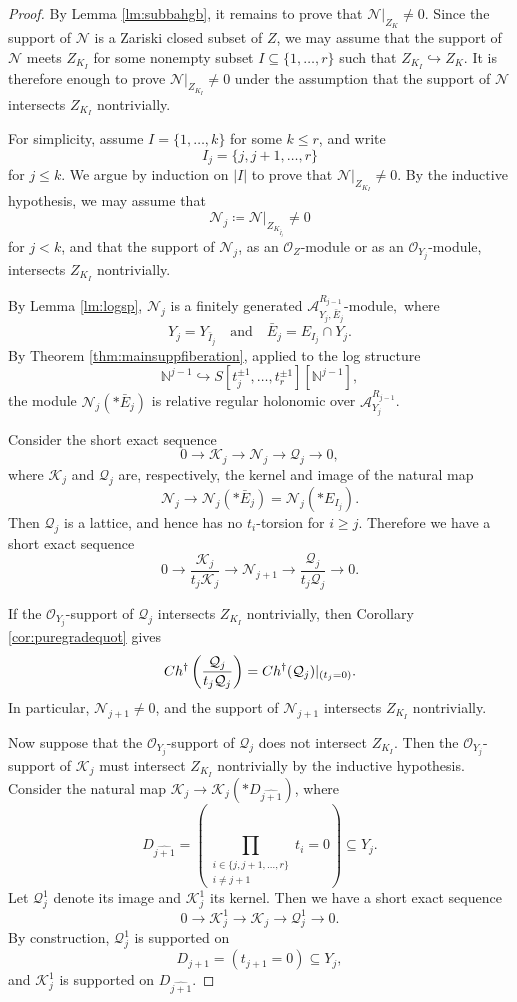 \documentclass[10pt,a4paper]{amsart}
\newcommand{\Ch}{\textup{Ch}}
\newcommand{\N}{\mathbb{N}}
\newcommand{\cK}{\mathcal{K}}
\newcommand{\cN}{\mathcal{N}}
\newcommand{\cO}{\mathscr{O}}
\newcommand{\cQ}{\mathcal{Q}}
\newcommand{\sA}{\mathscr{A}}
\begin{document}
\begin{proof}
By Lemma \ref{lm:subbahgb}, it remains to prove that
$\cN|_{Z_K}\neq 0.$
Since the support of $\cN$ is a Zariski closed subset of $Z$, we may assume
that the support of $\cN$ meets $Z_{K_I}$ for some nonempty subset
$I\subseteq \{1,\dots,r\}$
such that
$Z_{K_I}\hookrightarrow Z_K.$
It is therefore enough to prove
$\cN|_{Z_{K_I}}\neq 0$
under the assumption that the support of $\cN$ intersects $Z_{K_I}$
nontrivially.

For simplicity, assume
$I=\{1,\dots,k\}$
for some $k\le r$, and write
\[
I_j=\{j,j+1,\dots,r\}
\]
for $j\le k$. We argue by induction on $|I|$ to prove that
$\cN|_{Z_{K_I}}\neq 0.$
By the inductive hypothesis, we may assume that
\[
\cN_j
\coloneqq
\cN|_{Z_{K_{\bar I_j}}}
\neq 0
\]
for $j<k$, and that the support of $\cN_j$, as an $\cO_Z$-module or as an
$\cO_{Y_j}$-module, intersects $Z_{K_I}$ nontrivially.

By Lemma \ref{lm:logsp}, $\cN_j$ is a finitely generated
$\sA_{Y_j,\bar E_j}^{R_{j-1}}\text{-module},$
where
\[
Y_j=Y_{\bar I_j}
\quad \text{and} \quad
\bar E_j=E_{I_j}\cap Y_j.
\]
By Theorem \ref{thm:mainsuppfiberation}, applied to the log structure
\[
\N^{j-1}
\hookrightarrow
S[t_j^{\pm1},\dots,t_r^{\pm1}][\N^{j-1}],
\]
the module $\cN_j(*\bar E_j)$ is relative regular holonomic over
$\sA_{Y_j}^{R_{j-1}}$.

Consider the short exact sequence
\[
0
\to
\cK_j
\to
\cN_j
\to
\cQ_j
\to
0,
\]
where $\cK_j$ and $\cQ_j$ are, respectively, the kernel and image of the
natural map
\[
\cN_j\to \cN_j(*\bar E_j)=\cN_j(*E_{I_j}).
\]
Then $\cQ_j$ is a lattice, and hence has no $t_i$-torsion for $i\ge j$.
Therefore we have a short exact sequence
\[
0
\to
\frac{\cK_j}{t_j\cK_j}
\to
\cN_{j+1}
\to
\frac{\cQ_j}{t_j\cQ_j}
\to
0.
\]

If the $\cO_{Y_j}$-support of $\cQ_j$ intersects $Z_{K_I}$ nontrivially, then
Corollary \ref{cor:puregradequot} gives
\[
\Ch^\dagger\left(\frac{\cQ_j}{t_j\cQ_j}\right)
=
\Ch^\dagger(\cQ_j)|_{(t_j=0)}.
\]
In particular, $\cN_{j+1}\neq 0$, and the support of $\cN_{j+1}$ intersects
$Z_{K_I}$ nontrivially.

Now suppose that the $\cO_{Y_j}$-support of $\cQ_j$ does not intersect
$Z_{K_I}$. Then the $\cO_{Y_j}$-support of $\cK_j$ must intersect $Z_{K_I}$
nontrivially by the inductive hypothesis. Consider the natural map
$\cK_j\to \cK_j(*D_{\widehat{j+1}})$,
where
\[
D_{\widehat{j+1}}
=
\left(
\prod_{\substack{i\in\{j,j+1,\dots,r\}\\ i\neq j+1}}t_i=0
\right)
\subseteq Y_j.
\]
Let $\cQ_j^1$ denote its image and $\cK_j^1$ its kernel. Then we have a short
exact sequence
\begin{equation}\label{eq:aaabbbses123}
0
\to
\cK_j^1
\to
\cK_j
\to
\cQ_j^1
\to
0.
\end{equation}
By construction, $\cQ_j^1$ is supported on
\[
D_{j+1}=(t_{j+1}=0)\subseteq Y_j,
\]
and $\cK_j^1$ is supported on $D_{\widehat{j+1}}$.


\end{proof}
\end{document}

